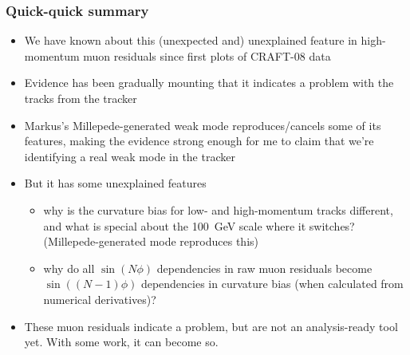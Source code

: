 \documentclass[compress]{beamer}
\begin{document}
\begin{frame}
\frametitle{Quick-quick summary}
\begin{itemize}\setlength{\itemsep}{0.15 cm}
\item We have known about this (unexpected and) unexplained feature in
  high-momentum muon residuals since first plots of CRAFT-08 data

\item Evidence has been gradually mounting that it indicates a problem
  with the tracks from the tracker

\item Markus's Millepede-generated weak mode reproduces/cancels some
  of its features, making the evidence strong enough for me to claim
  that we're identifying a real weak mode in the tracker

\item But it has some unexplained features
\begin{itemize}
\item why is the curvature bias for low- and high-momentum tracks
  different, and what is special about the 100~GeV scale where it
  switches?  (Millepede-generated mode reproduces this)

\item why do all $\sin(N\phi)$ dependencies in raw muon residuals
  become $\sin((N-1)\phi)$ dependencies in curvature bias (when
  calculated from numerical derivatives)?
\end{itemize}

\item These muon residuals indicate a problem, but are not an
  analysis-ready tool yet.  With some work, it can become so.
\end{itemize}
\end{frame}
\end{document}

